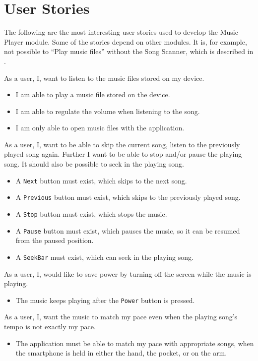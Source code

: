 \section{User Stories}
The following are the most interesting user stories used to develop the Music Player module. Some of the stories depend on other modules. It is, for example, not possible to ``Play music files'' without the Song Scanner, which is described in .

{As a user, I, want to listen to the music files stored on my device.}
{\begin{itemize}
\item I am able to play a music file stored on the device.
\item I am able to regulate the volume when listening to the song.
\item I am only able to open music files with the application.
\end{itemize}}

{As a user, I, want to be able to skip the current song, listen to the previously played song again. 
Further I want to be able to stop and/or pause the playing song.
It should also be possible to seek in the playing song.}
{\begin{itemize}
\item A \texttt{Next} button must exist, which skips to the next song.
\item A \texttt{Previous} button must exist, which skips to the previously played song.
\item A \texttt{Stop} button must exist, which stops the music.
\item A \texttt{Pause} button must exist, which pauses the music, so it can be resumed from the paused position.
\item A \texttt{SeekBar} must exist, which can seek in the playing song.
\end{itemize}}

{As a user, I, would like to save power by turning off the screen while the music is playing.}
{\begin{itemize}
\item The music keeps playing after the \texttt{Power} button is pressed.
\end{itemize}}

{As a user, I, want the music to match my pace even when the playing song's tempo is not exactly my pace.}
{\begin{itemize}
\item The application must be able to match my pace with appropriate songs, when the smartphone is held in either the hand, the pocket, or on the arm.
\end{itemize}}


